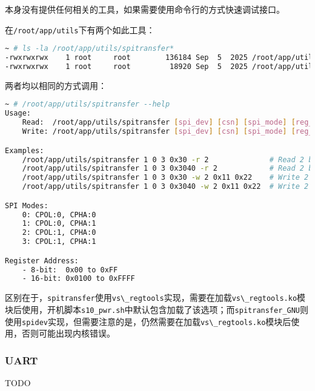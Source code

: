 \documentclass[UTF8]{ctexart}
\newcommand{\code}[1]{\colorbox{gray!10}{\lstinline[style=inlinecode]|#1|}}
\begin{document}
本身没有提供任何相关的工具，如果需要使用命令行的方式快速调试接口。

在\code{/root/app/utils}下有两个如此工具：

\begin{lstlisting}[language=sh]
~ # ls -la /root/app/utils/spitransfer*
-rwxrwxrwx    1 root     root        136184 Sep  5  2025 /root/app/utils/spitransfer
-rwxrwxrwx    1 root     root         18920 Sep  5  2025 /root/app/utils/spitransfer_GNU    
\end{lstlisting}

\noindent 两者均以相同的方式调用：

\begin{lstlisting}[language=sh]
~ # /root/app/utils/spitransfer --help
Usage:
    Read:  /root/app/utils/spitransfer [spi_dev] [csn] [spi_mode] [reg_addr] -r [bytes]
    Write: /root/app/utils/spitransfer [spi_dev] [csn] [spi_mode] [reg_addr] -w [data_bytes] [data1] [data2] ...

Examples:
    /root/app/utils/spitransfer 1 0 3 0x30 -r 2              # Read 2 bytes from 8-bit register 0x30
    /root/app/utils/spitransfer 1 0 3 0x3040 -r 2            # Read 2 bytes from 16-bit register 0x3040
    /root/app/utils/spitransfer 1 0 3 0x30 -w 2 0x11 0x22    # Write 2 bytes (0x11,0x22) to register 0x30
    /root/app/utils/spitransfer 1 0 3 0x3040 -w 2 0x11 0x22  # Write 2 bytes (0x11,0x22) to 16-bit register 0x3040

SPI Modes:
    0: CPOL:0, CPHA:0
    1: CPOL:0, CPHA:1
    2: CPOL:1, CPHA:0
    3: CPOL:1, CPHA:1

Register Address:
    - 8-bit:  0x00 to 0xFF
    - 16-bit: 0x0100 to 0xFFFF    
\end{lstlisting}

区别在于，\code{spitransfer}使用\code{vs\_regtools}实现，需要在加载\code{vs\_regtools.ko}模块后使用，开机脚本\code{s10_pwr.sh}中默认包含加载了该选项；而\code{spitransfer_GNU}则使用\code{spidev}实现，但需要注意的是，仍然需要在加载\code{vs\_regtools.ko}模块后使用，否则可能出现内核错误。

\subsubsection{UART}

TODO

\newpage

\end{document}
